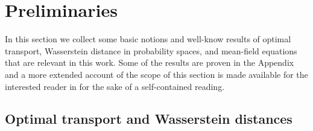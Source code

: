 
\section{Preliminaries}\label{meanfield}

{In this section we collect some basic notions and well-know results of  optimal transport, Wasserstein distance in probability spaces, and mean-field equations that are relevant in this work.
Some of the results are proven in the Appendix and a more extended account of the scope of this section is made available  for the interested reader in \cite{bofohama15} for the sake of a self-contained reading.}

\subsection{Optimal transport and Wasserstein distances}
